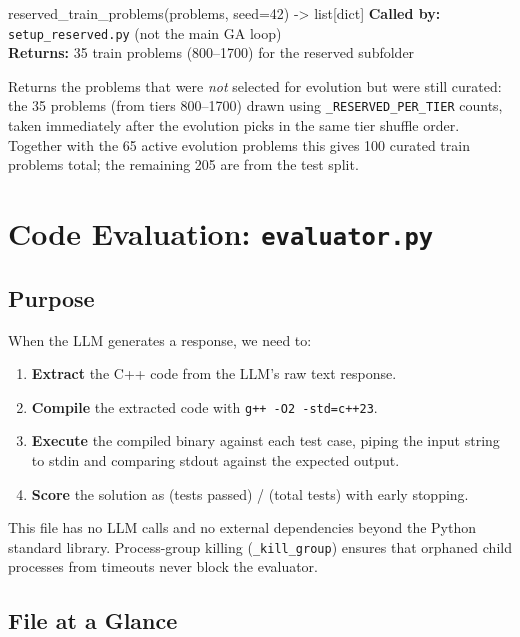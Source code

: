 \documentclass[11pt,a4paper]{report}
\newcommand{\pyfile}[1]{\texttt{#1}}
\newcommand{\fn}[1]{\texttt{#1}}
\begin{document}
\begin{specbox}{reserved\_train\_problems(problems, seed=42) -> list[dict]}
\textbf{Called by:} \fn{setup\_reserved.py} (not the main GA loop)\\
\textbf{Returns:} 35 train problems (800--1700) for the reserved subfolder
\end{specbox}

Returns the problems that were \emph{not} selected for evolution but were still curated:
the 35 problems (from tiers 800--1700) drawn using \fn{\_RESERVED\_PER\_TIER} counts, taken
immediately after the evolution picks in the same tier shuffle order.  Together with the
65 active evolution problems this gives 100 curated train problems total; the remaining
205 are from the test split.


\chapter{Code Evaluation: \pyfile{evaluator.py}}

\section{Purpose}

When the LLM generates a response, we need to:
\begin{enumerate}[nosep]
  \item \textbf{Extract} the C++ code from the LLM's raw text response.
  \item \textbf{Compile} the extracted code with \fn{g++ -O2 -std=c++23}.
  \item \textbf{Execute} the compiled binary against each test case, piping the input
    string to stdin and comparing stdout against the expected output.
  \item \textbf{Score} the solution as (tests passed) / (total tests) with early stopping.
\end{enumerate}

This file has no LLM calls and no external dependencies beyond the Python standard library.
Process-group killing (\fn{\_kill\_group}) ensures that orphaned child processes from timeouts
never block the evaluator.

\section{File at a Glance}
\end{document}
